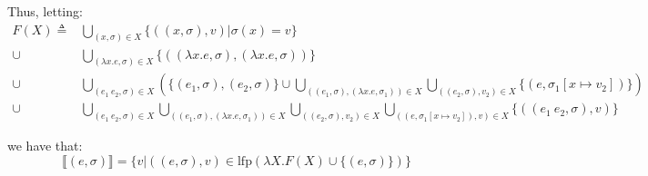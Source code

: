 \documentclass[12pt]{article}
\begin{document}
Thus, letting:
\begin{align*}
	F(X)\triangleq & \bigcup_{(x,\sigma)\in X}\{((x,\sigma),v)|\sigma(x)=v\}                                                                                                                                           \\
	\cup           & \bigcup_{(\lambda x.e,\sigma)\in X}\{((\lambda x.e,\sigma),(\lambda x.e,\sigma))\}                                                                                                                \\
	\cup           & \bigcup_{(e_1\:e_2,\sigma)\in X}\left(\{(e_1,\sigma),(e_2,\sigma)\}\cup\bigcup_{((e_1,\sigma),(\lambda x.e,\sigma_1))\in X}\bigcup_{((e_2,\sigma),v_2)\in X}\{(e,\sigma_1[x\mapsto v_2])\}\right) \\
  \cup           & \bigcup_{(e_1\:e_2,\sigma)\in X}\bigcup_{((e_1,\sigma),(\lambda x.e,\sigma_1))\in X}\bigcup_{((e_2,\sigma),v_2)\in X}\bigcup_{((e,\sigma_1[x\mapsto v_2]),v)\in X}\{((e_1\:e_2,\sigma),v)\}
\end{align*}

we have that:
\[\lBrack(e,\sigma)\rBrack=\{v|((e,\sigma),v)\in\text{lfp}(\lambda X.F(X)\cup\{(e,\sigma)\})\}\]


\nocite{*}
\end{document}

